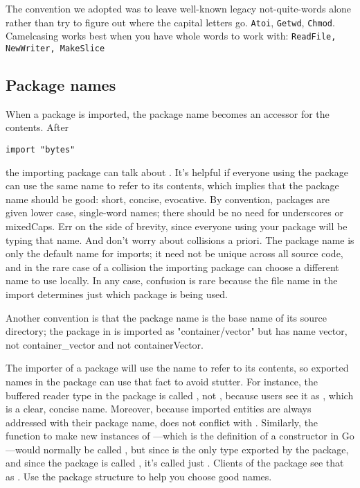 The convention we adopted was to leave well-known legacy
not-quite-words alone rather than try to figure out where
the capital letters go.  \lstinline{Atoi}, \lstinline{Getwd},
\lstinline{Chmod}.
Camelcasing works best when you have whole words
to work with: \lstinline{ReadFile, NewWriter, MakeSlice}

\subsection{Package names}
When a package is imported, the package name becomes an accessor for the
contents. After
\begin{lstlisting}
import "bytes"
\end{lstlisting}
the importing package can talk about . It's helpful if
everyone using the package can use the same name to refer to its
contents, which implies that the package name should be good: short,
concise, evocative. By convention, packages are given lower case,
single-word names; there should be no need for underscores or mixedCaps.
Err on the side of brevity, since everyone using your package will be
typing that name. And don't worry about collisions a priori. The package
name is only the default name for imports; it need not be unique across
all source code, and in the rare case of a collision the importing
package can choose a different name to use locally. In any case,
confusion is rare because the file name in the import determines just
which package is being used.

Another convention is that the package name is the base name of its
source directory; the package in  is imported as
"container/vector" but has name vector, not container\_vector and not
containerVector.

The importer of a package will use the name to refer to its contents, so 
exported names in the package can use that fact to avoid
stutter. For instance, the buffered reader type in the  package is
called , not , because users see it as
,
which is a clear, concise name. Moreover, because imported entities are
always addressed with their package name,  does not conflict
with . Similarly, the function to make new instances of
---which is the definition of a constructor in Go---would normally
be called , but since  is the only type exported by the
package, and since the package is called , it's called
just .
Clients of the package see that as . Use the package structure
to help you choose good names.

